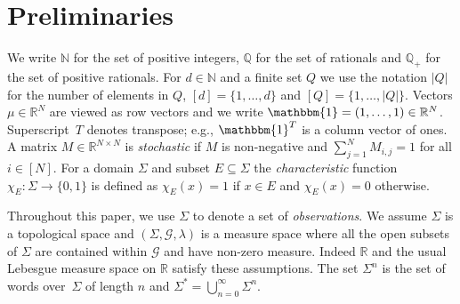 \documentclass[a4paper,UKenglish,cleveref, autoref,mathscr]{lipics-v2019}
\newcommand{\RR}{\mathbb{R}}
\newcommand{\NN}{\mathbb{N}}
\newcommand{\QQ}{\mathbb{Q}}
\newcommand{\GG}{\mathscr{G}}
\newcommand{\1}{\mathbbm{1}}
\begin{document}
%





\section{Preliminaries}
We write $\NN$ for the set of positive integers, $\QQ$ for the set of rationals and $\QQ_+$ for the set of positive rationals.
For $d \in \NN$ and a finite set $Q$ we use the notation $|Q|$ for the number of elements in $Q$, $[d] = \{1, \dots, d\}$ and $[Q] = \{1, \dots, |Q|\}$. Vectors $\mu \in \RR^N$ are viewed as row vectors and we write $\1 = (1, \dots, 1) \in \RR^N$.
Superscript~$T$ denotes transpose; e.g., $\1^T$ is a column vector of ones.
A matrix $M \in \RR^{N \times N}$ is \emph{stochastic} if $M$ is non-negative and $\sum_{j = 1}^{N} M_{i,j} = 1$ for all $i \in [N]$.
For a domain $\Sigma$ and subset $E \subseteq \Sigma$ the \emph{characteristic} function $\chi_E : \Sigma \rightarrow \{0,1\}$ is defined as $\chi_E(x) = 1$ if $x \in E$ and $\chi_E(x) = 0$ otherwise.

Throughout this paper, we use $\Sigma$ to denote a set of \emph{observations}.
We assume $\Sigma$ is a topological space and $(\Sigma, \GG, \lambda)$ is a measure space where all the open subsets of $\Sigma$ are contained within $\GG$ and have non-zero measure. Indeed $\RR$ and the usual Lebesgue measure space on $\RR$ satisfy these assumptions.
The set $\Sigma^n$ is the set of words over~$\Sigma$ of length $n$ and $\Sigma^* = \bigcup_{n = 0}^\infty \Sigma^n$.
\end{document}
